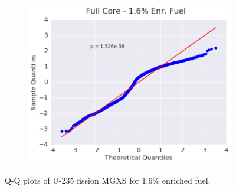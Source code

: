 \begin{figure}[h!]
\begin{subfigure}{0.5\textwidth}
  \centering
  \includegraphics[width=\linewidth]{figures/patterns/full-core/quantile/16-enr-fiss-2} \caption{}
  \label{fig:chap9-qq-full-core-1.6-fiss}
\end{subfigure}
\caption[Q-Q plots of U-235 fission MGXS for 1.6\% enriched fuel]{Q-Q plots of U-235 fission \ac{MGXS} for 1.6\% enriched fuel.}
\label{fig:chap9-qq-1.6-fiss}
\end{figure}

